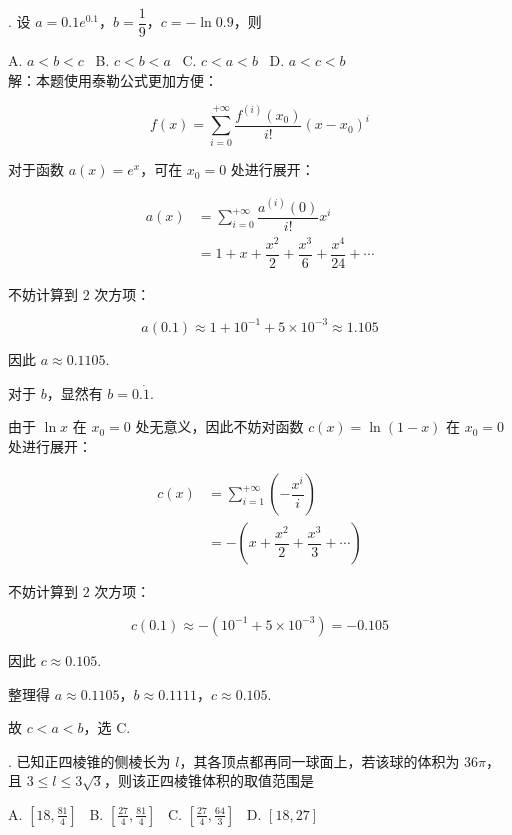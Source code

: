 \documentclass[UTF8]{ctexart}
\newcommand{\lt}{<}
\begin{document}
\thispagestyle{empty}
\pagestyle{empty}

. 设 $a=0.1e^{0.1}$，$b=\dfrac{1}{9}$，$c=-\ln 0.9$，则

\noindent A. $a \lt b \lt c$ \,
B. $c \lt b \lt a$ \,
C. $c \lt a \lt b$ \,
D. $a \lt c \lt b$ \\

\noindent 解：本题使用泰勒公式更加方便：

$$f(x)=\sum_{i=0}^{+\infty} \dfrac{f^{(i)}(x_0)}{i!} (x-x_0)^i$$

\noindent 对于函数 $a(x)=e^x$，可在 $x_0=0$ 处进行展开：

\begin{align*}
a(x) &= \sum_{i=0}^{+\infty} \dfrac{a^{(i)}(0)}{i!} x^i \\
&= 1+x+\dfrac{x^2}{2}+\dfrac{x^3}{6}+
\dfrac{x^4}{24}+\cdots
\end{align*}

\noindent 不妨计算到 $2$ 次方项：

$$a(0.1) \approx 1+10^{-1}+5 \times 10^{-3} \approx 1.105$$

\noindent 因此 $a \approx 0.1105$.

\noindent 对于 $b$，显然有 $b=0.\dot 1$.

\noindent 由于 $\ln x$ 在 $x_0=0$ 处无意义，因此不妨对函数 $c(x)=\ln (1-x)$ 在 $x_0=0$ 处进行展开：

\begin{align*}
c(x) &= \sum_{i=1}^{+\infty} (-\dfrac{x^i}{i}) \\
&= -(x+\dfrac{x^2}{2}+\dfrac{x^3}{3}+\cdots)
\end{align*}

\noindent 不妨计算到 $2$ 次方项：

$$c(0.1) \approx -(10^{-1}+5 \times 10^{-3})=-0.105$$

\noindent 因此 $c \approx 0.105$.

\noindent 整理得 $a \approx 0.1105$，$b \approx 0.1111$，$c \approx 0.105$.

\noindent 故 $c \lt a \lt b$，选 C.

\newpage

. 已知正四棱锥的侧棱长为 $l$，其各顶点都再同一球面上，若该球的体积为 $36 \pi$，且 $3 \le l \le 3 \sqrt 3$，则该正四棱锥体积的取值范围是

\noindent A. $[18,\frac{81}{4}]$ \,
B. $[\frac{27}{4},\frac{81}{4}]$ \,
C. $[\frac{27}{4},\frac{64}{3}]$ \,
D. $[18,27]$ \\
\end{document}
